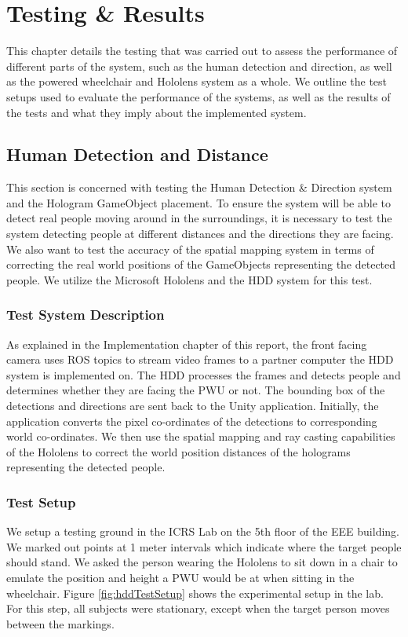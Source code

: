\chapter{Testing \& Results}
This chapter details the testing that was carried out to assess the performance of different parts of the system, such as the human detection and direction, as well as the powered wheelchair and Hololens system as a whole. We outline the test setups used to evaluate the performance of the systems, as well as the results of the tests and what they imply about the implemented system.

\section{Human Detection and Distance}
This section is concerned with testing the Human Detection \& Direction system and the Hologram GameObject placement. To ensure the system will be able to detect real people moving around in the surroundings, it is necessary to test the system detecting people at different distances and the directions they are facing. We also want to test the accuracy of the spatial mapping system in terms of correcting the real world positions of the GameObjects representing the detected people. We utilize the Microsoft Hololens and the HDD system for this test.

\subsection{Test System Description} \label{sec:hddSys}
As explained in the Implementation chapter of this report, the front facing camera uses ROS topics to stream video frames to a partner computer the HDD system is implemented on. The HDD processes the frames and detects people and determines whether they are facing the PWU or not. The bounding box of the detections and directions are sent back to the Unity application. Initially, the application converts the pixel co-ordinates of the detections to corresponding world co-ordinates. We then use the spatial mapping and ray casting capabilities of the Hololens to correct the world position distances of the holograms representing the detected people.

\subsection{Test Setup} \label{sec:testSetup}
We setup a testing ground in the ICRS Lab on the 5th floor of the EEE building. We marked out points at 1 meter intervals which indicate where the target people should stand. We asked the person wearing the Hololens to sit down in a chair to emulate the position and height a PWU would be at when sitting in the wheelchair. Figure \ref{fig:hddTestSetup} shows the experimental setup in the lab. For this step, all subjects were stationary, except when the target person moves between the markings.

